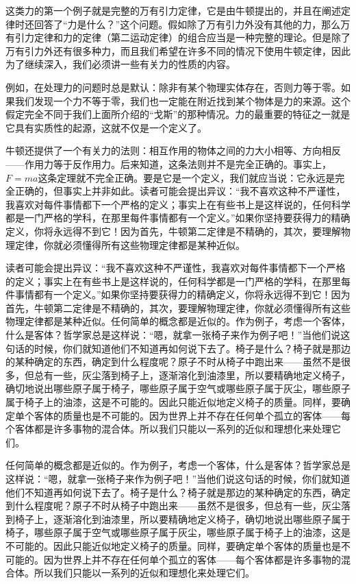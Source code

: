 这类力的第一个例子就是完整的万有引力定律，它是由牛顿提出的，并且在阐述定律时还回答了“力是什么？”这个问题。假如除了万有引力外没有其他的力，那么万有引力定律和力的定律（第二运动定律）的组合应当是一种完整的理论。但是除了万有引力外还有很多种力，而且我们希望在许多不同的情况下使用牛顿定律，因此为了继续深入，我们必须讲一些有关力的性质的内容。

例如，在处理力的问题时总是默认：除非有某个物理实体存在，否则力等于零。如果我们发现一个力不等于零，我们也一定能在附近找到某个物体是力的来源。这个假定完全不同于我们上面所介绍的“戈斯”的那种情况。力的最重要的特征之一就是它具有实质性的起源，这就不仅是一个定义了。

牛顿还提供了一个有关力的法则：相互作用的物体之间的力大小相等、方向相反——作用力等于反作用力。后来知道，这条法则并不是完全正确的。事实上，$F=ma$这条定理就不完全正确。要是它是一个定义，我们就应当说：它永远是完全正确的，但事实上并非如此。读者可能会提出异议：“我不喜欢这种不严谨性，我喜欢对每件事情都下一个严格的定义；事实上在有些书上是这样说的，任何科学都是一门严格的学科，在那里每件事情都有一个定义。”如果你坚持要获得力的精确定义，你将永远得不到它！因为首先，牛顿第二定律是不精确的，其次，要理解物理定律，你就必须懂得所有这些物理定律都是某种近似。

读者可能会提出异议：“我不喜欢这种不严谨性，我喜欢对每件事情都下一个严格的定义；事实上在有些书上是这样说的，任何科学都是一门严格的学科，在那里每件事情都有一个定义。”如果你坚持要获得力的精确定义，你将永远得不到它！因为首先，牛顿第二定律是不精确的，其次，要理解物理定律，你就必须懂得所有这些物理定律都是某种近似。任何简单的概念都是近似的。作为例子，考虑一个客体，什么是客体？哲学家总是这样说：“嗯，就拿一张椅子来作为例子吧！”当他们说这句话的时候，你们就知道他们不知道再如何说下去了。椅子是什么？椅子就是那边的某种确定的东西，确定到什么程度呢？原子不时从椅子中跑出来——虽然不是很多，但总有一些，灰尘落到椅子上，逐渐溶化到油漆里，所以要精确地定义椅子，确切地说出哪些原子属于椅子，哪些原子属于空气或哪些原子属于灰尘，哪些原子属于椅子上的油漆，这是不可能的。因此只能近似地定义椅子的质量。同样，要确定单个客体的质量也是不可能的。因为世界上并不存在任何单个孤立的客体——每个客体都是许多事物的混合体。所以我们只能以一系列的近似和理想化来处理它们。

任何简单的概念都是近似的。作为例子，考虑一个客体，什么是客体？哲学家总是这样说：“嗯，就拿一张椅子来作为例子吧！”当他们说这句话的时候，你们就知道他们不知道再如何说下去了。椅子是什么？椅子就是那边的某种确定的东西，确定到什么程度呢？原子不时从椅子中跑出来——虽然不是很多，但总有一些，灰尘落到椅子上，逐渐溶化到油漆里，所以要精确地定义椅子，确切地说出哪些原子属于椅子，哪些原子属于空气或哪些原子属于灰尘，哪些原子属于椅子上的油漆，这是不可能的。因此只能近似地定义椅子的质量。同样，要确定单个客体的质量也是不可能的。因为世界上并不存在任何单个孤立的客体——每个客体都是许多事物的混合体。所以我们只能以一系列的近似和理想化来处理它们。

